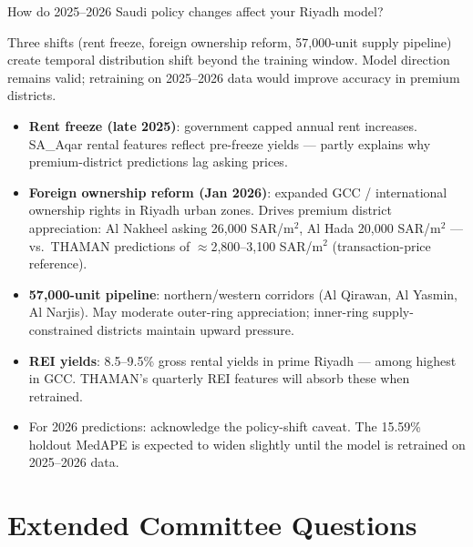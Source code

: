 \documentclass[11pt, a4paper, twoside]{article}
\begin{document}
\begin{question}{How do 2025--2026 Saudi policy changes affect your Riyadh model?}
\begin{shortanswer}
Three shifts (rent freeze, foreign ownership reform, 57,000-unit supply
pipeline) create temporal distribution shift beyond the training window.
Model direction remains valid; retraining on 2025--2026 data would improve
accuracy in premium districts.
\end{shortanswer}

\begin{detail}
\begin{itemize}
  \item \textbf{Rent freeze (late 2025)}: government capped annual rent
        increases. SA\_Aqar rental features reflect pre-freeze yields ---
        partly explains why premium-district predictions lag asking prices.
  \item \textbf{Foreign ownership reform (Jan 2026)}: expanded GCC /
        international ownership rights in Riyadh urban zones. Drives premium
        district appreciation: Al Nakheel asking 26,000 SAR/m$^2$,
        Al Hada 20,000 SAR/m$^2$ --- vs.\ THAMAN predictions of
        $\approx$2,800--3,100 SAR/m$^2$ (transaction-price reference).
  \item \textbf{57,000-unit pipeline}: northern/western corridors
        (Al Qirawan, Al Yasmin, Al Narjis). May moderate outer-ring
        appreciation; inner-ring supply-constrained districts maintain
        upward pressure.
  \item \textbf{REI yields}: 8.5--9.5\% gross rental yields in prime
        Riyadh --- among highest in GCC. THAMAN's quarterly REI features
        will absorb these when retrained.
  \item For 2026 predictions: acknowledge the policy-shift caveat.
        The 15.59\% holdout MedAPE is expected to widen slightly until
        the model is retrained on 2025--2026 data.
\end{itemize}
\end{detail}
\end{question}

\section{Extended Committee Questions}
\label{sec:extended}
\end{document}
